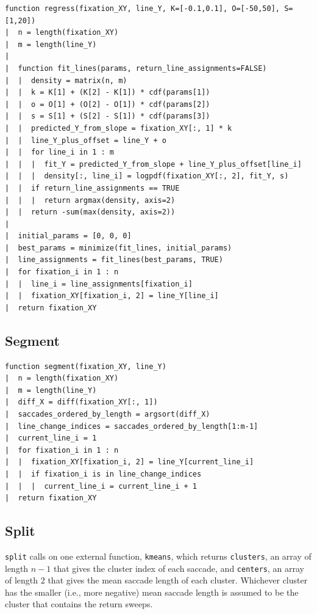 \documentclass[doc,biblatex]{apa7}
\begin{document}
\begin{verbatim}
function regress(fixation_XY, line_Y, K=[-0.1,0.1], O=[-50,50], S=[1,20])
|  n = length(fixation_XY)
|  m = length(line_Y)
|
|  function fit_lines(params, return_line_assignments=FALSE)
|  |  density = matrix(n, m)
|  |  k = K[1] + (K[2] - K[1]) * cdf(params[1])
|  |  o = O[1] + (O[2] - O[1]) * cdf(params[2])
|  |  s = S[1] + (S[2] - S[1]) * cdf(params[3])
|  |  predicted_Y_from_slope = fixation_XY[:, 1] * k
|  |  line_Y_plus_offset = line_Y + o
|  |  for line_i in 1 : m
|  |  |  fit_Y = predicted_Y_from_slope + line_Y_plus_offset[line_i]
|  |  |  density[:, line_i] = logpdf(fixation_XY[:, 2], fit_Y, s)
|  |  if return_line_assignments == TRUE
|  |  |  return argmax(density, axis=2)
|  |  return -sum(max(density, axis=2))
|
|  initial_params = [0, 0, 0]
|  best_params = minimize(fit_lines, initial_params)
|  line_assignments = fit_lines(best_params, TRUE)
|  for fixation_i in 1 : n
|  |  line_i = line_assignments[fixation_i]
|  |  fixation_XY[fixation_i, 2] = line_Y[line_i]
|  return fixation_XY
\end{verbatim}

\subsection{Segment}

\begin{verbatim}
function segment(fixation_XY, line_Y)
|  n = length(fixation_XY)
|  m = length(line_Y)
|  diff_X = diff(fixation_XY[:, 1])
|  saccades_ordered_by_length = argsort(diff_X)
|  line_change_indices = saccades_ordered_by_length[1:m-1]
|  current_line_i = 1
|  for fixation_i in 1 : n
|  |  fixation_XY[fixation_i, 2] = line_Y[current_line_i]
|  |  if fixation_i is in line_change_indices
|  |  |  current_line_i = current_line_i + 1
|  return fixation_XY
\end{verbatim}

\subsection{Split}

\texttt{split} calls on one external function, \texttt{kmeans}, which returns \texttt{clusters}, an array of length $n-1$ that gives the cluster index of each saccade, and \texttt{centers}, an array of length $2$ that gives the mean saccade length of each cluster. Whichever cluster has the smaller (i.e., more negative) mean saccade length is assumed to be the cluster that contains the return sweeps.
\end{document}
